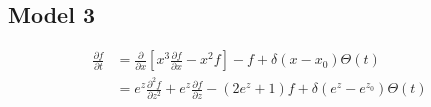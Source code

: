 \documentclass{article}
\begin{document}
\subsection{Model 3}
    \begin{equation}
        \begin{split}
            \frac{\partial f} {\partial t} &= \frac{\partial}{\partial x}
            \left[x^3 \frac{\partial f}{\partial x} - x^2f\right]
             - f
             + \delta(x-x_0)\Theta(t)
             \\
            &= e^{z}\frac{\partial^2 f}{\partial z^2}
            +  e^{z} \frac{\partial f}{\partial z}
            - \left(2e^z+1\right) f
            + \delta(e^{z}-e^{z_0})\Theta(t)
        \end{split}
    \end{equation}
\end{document}
